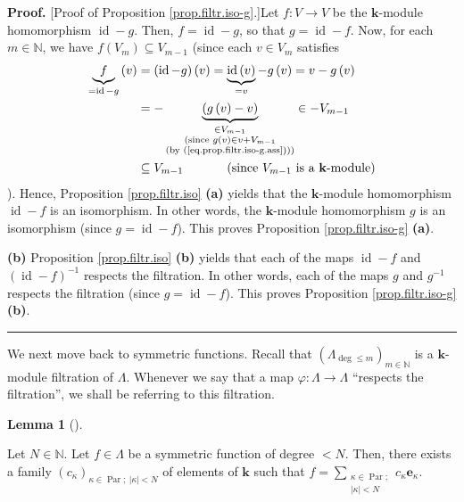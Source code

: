 \documentclass[numbers=enddot,12pt,final,onecolumn,notitlepage]{scrartcl}%
\theoremstyle{definition}
\newtheorem{lem}[theo]{Lemma}
\newenvironment{lemma}[1][]
{\begin{lem}[#1]\begin{leftbar}}
{\end{leftbar}\end{lem}}
\newenvironment{proof}[1][Proof]{\noindent\textbf{#1.} }{\ \rule{0.5em}{0.5em}}
\let\sumnonlimits\sum
\renewcommand{\sum}{\sumnonlimits\limits}
\begin{document}
\begin{proof}
[Proof of Proposition \ref{prop.filtr.iso-g}.]Let $f:V\rightarrow V$ be the
$\mathbf{k}$-module homomorphism $\operatorname*{id}-g$. Then,
$f=\operatorname*{id}-g$, so that $g=\operatorname*{id}-f$. Now, for each
$m\in\mathbb{N}$, we have $f\left(  V_{m}\right)  \subseteq V_{m-1}$ (since
each $v\in V_{m}$ satisfies%
\begin{align*}
\underbrace{f}_{=\operatorname*{id}-g}\left(  v\right)   &  =\left(
\operatorname*{id}-g\right)  \left(  v\right)  =\underbrace{\operatorname*{id}%
\left(  v\right)  }_{=v}-g\left(  v\right)  =v-g\left(  v\right) \\
&  =-\underbrace{\left(  g\left(  v\right)  -v\right)  }_{\substack{\in
V_{m-1}\\\text{(since }g\left(  v\right)  \in v+V_{m-1}\\\text{(by
(\ref{eq.prop.filtr.iso-g.ass})))}}}\in-V_{m-1}\\
&  \subseteq V_{m-1}\ \ \ \ \ \ \ \ \ \ \left(  \text{since }V_{m-1}\text{ is
a }\mathbf{k}\text{-module}\right)
\end{align*}
). Hence, Proposition \ref{prop.filtr.iso} \textbf{(a)} yields that the
$\mathbf{k}$-module homomorphism $\operatorname{id}-f$ is an isomorphism. In
other words, the $\mathbf{k}$-module homomorphism $g$ is an isomorphism (since
$g=\operatorname*{id}-f$). This proves Proposition \ref{prop.filtr.iso-g}
\textbf{(a)}.

\textbf{(b)} Proposition \ref{prop.filtr.iso} \textbf{(b)} yields that each of
the maps $\operatorname{id}-f$ and $\left(  \operatorname{id}-f\right)  ^{-1}$
respects the filtration. In other words, each of the maps $g$ and $g^{-1}$
respects the filtration (since $g=\operatorname*{id}-f$). This proves
Proposition \ref{prop.filtr.iso-g} \textbf{(b)}.
\end{proof}

We next move back to symmetric functions. Recall that $\left(  \Lambda
_{\deg\leq m}\right)  _{m\in\mathbb{N}}$ is a $\mathbf{k}$-module filtration
of $\Lambda$. Whenever we say that a map $\varphi:\Lambda\rightarrow\Lambda$
\textquotedblleft respects the filtration\textquotedblright, we shall be
referring to this filtration.

\begin{lemma}
\label{lem.bigquot.e-as-smaller}Let $N\in\mathbb{N}$. Let $f\in\Lambda$ be a
symmetric function of degree $<N$. Then, there exists a family $\left(
c_{\kappa}\right)  _{\kappa\in\operatorname*{Par};\ \left\vert \kappa
\right\vert <N}$ of elements of $\mathbf{k}$ such that $f=\sum
_{\substack{\kappa\in\operatorname*{Par};\\\left\vert \kappa\right\vert
<N}}c_{\kappa}\mathbf{e}_{\kappa}$.
\end{lemma}
\end{document}
